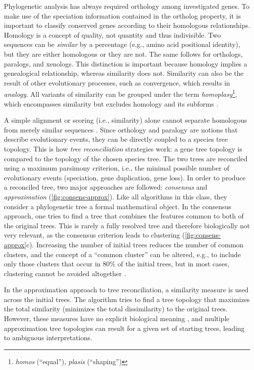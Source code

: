 Phylogenetic analysis has always required orthology among investigated genes.
To make use of the speciation information contained in the ortholog property, it
is important to classify conserved genes according to their homologous
relationships. Homology is a concept of quality, not quantity \citep{reeck1987}
and thus indivisible. Two sequences can be \emph{similar} by a percentage (e.g.,
amino acid positional identity), but they are either homologous or they are not.
The same follows for orthologs, paralogs, and xenologs. This distinction is
important because homology implies a genealogical relationship, whereas
similarity does not. Similarity can also be the result of other evolutionary
processes, such as convergence, which results in \emph{analogy}. All variants of
similarity can be grouped under the term \emph{homoplasy}\footnote{\emph{homos}
(``equal''), \emph{plasis} (``shaping'')}, which encompasses similarity but
excludes homology and its subforms \citep{page1998}.

A simple alignment or scoring (i.e., similarity) alone cannot separate
homologous from merely similar sequences \citep{eisen1998}. Since orthology and
paralogy are notions that describe evolutionary events, they can be directly
coupled to a species tree topology. This is how \emph{tree reconciliation}
strategies work: a gene tree topology is compared to the topology of the chosen
species tree. The two trees are reconciled using a maximum parsimony criterion,
i.e., the minimal possible number of evolutionary events (speciation, gene
duplication, gene loss). In order to produce a reconciled tree, two major
approaches are followed: \emph{consensus} and \emph{approximation}
(\autoref{fig:consens-approx}). Like all algorithms in this class, they consider
a phylogenetic tree a formal mathematical object. In the consensus approach, one
tries to find a tree that combines the features common to both of the original
trees. This is rarely a fully resolved tree and therefore biologically not very
relevant, as the consensus criterion leads to clustering
(\autoref{fig:consens-approx}c). Increasing the number of initial trees reduces
the number of common clusters, and the concept of a ``common cluster'' can be
altered, e.g., to include only those clusters that occur in 80\% of the initial
trees, but in most cases, clustering cannot be avoided altogether
\citep{mirkin1995}.



In the approximation approach to tree reconciliation, a similarity measure is
used across the initial trees. The algorithm tries to find a tree topology that
maximizes the total similarity (minimizes the total dissimilarity) to the
original trees. However, these measures have no explicit biological meaning
\citep{mirkin1995}, and multiple approximation tree topologies can result for a
given set of starting trees, leading to ambiguous interpretations. 

